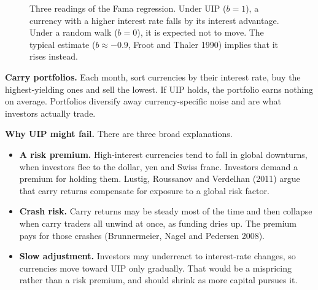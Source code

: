 \begin{figure}[htbp]
\centering
{}
\caption{Three readings of the Fama regression. Under UIP ($b = 1$), a currency with a higher interest rate falls by its interest advantage. Under a random walk ($b = 0$), it is expected not to move. The typical estimate ($b \approx -0.9$, Froot and Thaler 1990) implies that it rises instead.}
\label{fig:11-fama}
\end{figure}

\textbf{Carry portfolios.} Each month, sort currencies by their interest rate, buy the highest-yielding ones and sell the lowest. If UIP holds, the portfolio earns nothing on average. Portfolios diversify away currency-specific noise and are what investors actually trade.

\textbf{Why UIP might fail.} There are three broad explanations.

\begin{itemize}
  \item \textbf{A risk premium.} High-interest currencies tend to fall in global downturns, when investors flee to the dollar, yen and Swiss franc. Investors demand a premium for holding them. Lustig, Roussanov and Verdelhan (2011) argue that carry returns compensate for exposure to a global risk factor.
  \item \textbf{Crash risk.} Carry returns may be steady most of the time and then collapse when carry traders all unwind at once, as funding dries up. The premium pays for those crashes (Brunnermeier, Nagel and Pedersen 2008).
  \item \textbf{Slow adjustment.} Investors may underreact to interest-rate changes, so currencies move toward UIP only gradually. That would be a mispricing rather than a risk premium, and should shrink as more capital pursues it.
\end{itemize}

